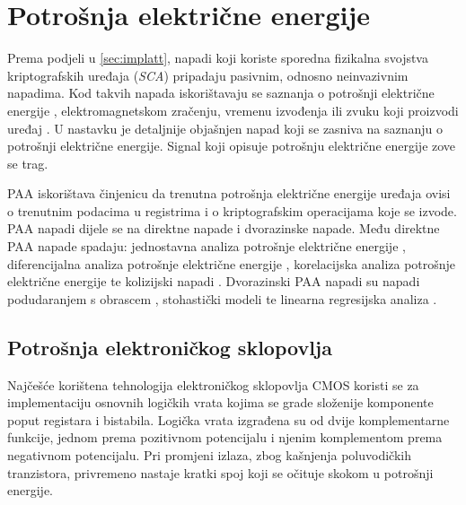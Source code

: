\documentclass[times, utf8, numeric, diplomski]{fer}
\def\todoimg#1{\begin{center} \textcolor{red}{\big[ IMAGE: \textit{#1} \big]} \end{center}}
\begin{document}

\section{Potrošnja električne energije}
Prema podjeli u \ref{sec:implatt}, napadi koji koriste sporedna fizikalna svojstva kriptografskih uređaja (\textit{SCA}) pripadaju pasivnim, odnosno neinvazivnim napadima. Kod takvih napada iskorištavaju se saznanja o potrošnji električne energije , elektromagnetskom zračenju, vremenu izvođenja ili zvuku koji proizvodi uređaj \citep{picekphd}. U nastavku je detaljnije objašnjen napad koji se zasniva na saznanju o potrošnji električne energije. Signal koji opisuje potrošnju električne energije zove se trag.


PAA iskorištava činjenicu da trenutna potrošnja električne energije uređaja ovisi o trenutnim podacima u registrima i o kriptografskim operacijama koje se izvode. PAA napadi dijele se na direktne napade i dvorazinske napade. Među direktne PAA napade spadaju: jednostavna analiza potrošnje električne energije , diferencijalna analiza potrošnje električne energije , korelacijska analiza potrošnje električne energije  te kolizijski napadi . Dvorazinski PAA napadi su napadi podudaranjem s obrascem , stohastički modeli  te linearna regresijska analiza  \citep{sca_lectures}.

\subsection{Potrošnja elektroničkog sklopovlja}
Najčešće korištena tehnologija elektroničkog sklopovlja CMOS  koristi se za implementaciju osnovnih logičkih vrata kojima se grade složenije komponente poput registara i bistabila. Logička vrata izgrađena su od dvije komplementarne funkcije, jednom prema pozitivnom potencijalu i njenim komplementom prema negativnom potencijalu. Pri promjeni izlaza, zbog kašnjenja poluvodičkih tranzistora, privremeno nastaje kratki spoj koji se očituje skokom u potrošnji energije.
\end{document}
